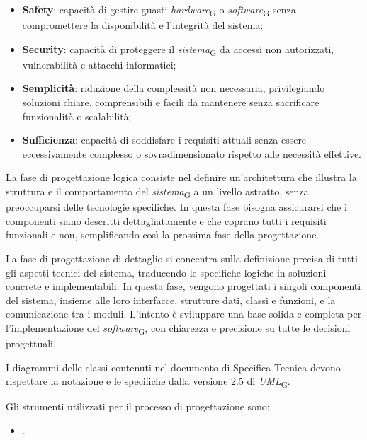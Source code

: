 \begin{itemize}
    \item \textbf{Safety}: capacità di gestire guasti \textit{hardware}\textsubscript{G} o \textit{software}\textsubscript{G} senza compromettere la disponibilità e l'integrità del sistema;
    \item \textbf{Security}: capacità di proteggere il \textit{sistema}\textsubscript{G} da accessi non autorizzati, vulnerabilità e attacchi informatici;
    \item \textbf{Semplicità}: riduzione della complessità non necessaria, privilegiando soluzioni chiare, comprensibili e facili da mantenere senza sacrificare funzionalità o scalabilità;
    \item \textbf{Sufficienza}: capacità di soddisfare i requisiti attuali senza essere eccessivamente complesso o sovradimensionato rispetto alle necessità effettive.
\end{itemize}

La fase di progettazione logica consiste nel definire un'architettura che illustra la struttura e il comportamento del \textit{sistema}\textsubscript{G} a un livello astratto, senza preoccuparsi delle tecnologie specifiche. In questa fase bisogna assicurarsi che i componenti siano descritti dettagliatamente e che coprano tutti i requisiti funzionali e non, semplificando così la prossima fase della progettazione.

La fase di progettazione di dettaglio si concentra sulla definizione precisa di tutti gli aspetti tecnici del sistema, traducendo le specifiche logiche in soluzioni concrete e implementabili. In questa fase, vengono progettati i singoli componenti del sistema, insieme alle loro interfacce, strutture dati, classi e funzioni, e la comunicazione tra i moduli. L'intento è sviluppare una base solida e completa per l'implementazione del \textit{software}\textsubscript{G}, con chiarezza e precisione su tutte le decisioni progettuali.

I diagrammi delle classi contenuti nel documento di Specifica Tecnica devono rispettare la notazione e le specifiche dalla versione 2.5 di \textit{UML}\textsubscript{G}.

Gli strumenti utilizzati per il processo di progettazione sono:
\begin{itemize}
    \item {}.
\end{itemize}

